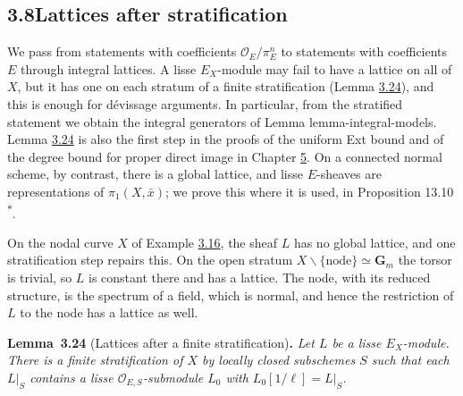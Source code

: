 \documentclass[11pt]{article}
\newenvironment{bpstatement}[2]{\par\addvspace{0.6\baselineskip}\noindent\textbf{#1}#2\textbf{.}\enspace\ignorespaces}
  {\par\addvspace{0.4\baselineskip}}
\newenvironment{bpstatementit}[2]{\begin{bpstatement}{#1}{#2}\itshape\ignorespaces}{\end{bpstatement}}
\newcommand{\bpout}[1]{#1\textsuperscript{\hyperlink{bp-outside}{\ensuremath{\ast}}}}
\begin{document}
\subsection*{\texorpdfstring{3.8\quad Lattices after stratification}{3.8 Lattices after stratification}}
\label{bp267}%
\label{bp268}%
We pass from statements with coefficients \(\mathcal O_E/\pi_E^n\) to statements with coefficients \(E\) through integral lattices. A lisse \(E_X\)-module may fail to have a lattice on all of \(X\), but it has one on each stratum of a finite stratification (Lemma \hyperref[bp269]{3.24}), and this is enough for dévissage arguments. In particular, from the stratified statement we obtain the integral generators of Lemma lemma-integral-models. Lemma \hyperref[bp269]{3.24} is also the first step in the proofs of the uniform Ext bound and of the degree bound for proper direct image in Chapter \hyperref[bp407]{5}. On a connected normal scheme, by contrast, there is a global lattice, and lisse \(E\)-sheaves are representations of \(\pi_1(X,\bar x)\); we prove this where it is used, in Proposition \bpout{13.10}.

On the nodal curve \(X\) of Example \hyperref[bp243]{3.16}, the sheaf \(L\) has no global lattice, and one stratification step repairs this. On the open stratum \(X\smallsetminus\{\text{node}\}\simeq\mathbf G_m\) the torsor is trivial, so \(L\) is constant there and has a lattice. The node, with its reduced structure, is the spectrum of a field, which is normal, and hence the restriction of \(L\) to the node has a lattice as well.

\label{bp269}%
\begin{bpstatementit}{Lemma~3.24}{ (Lattices after a finite stratification)}
Let \(L\) be a lisse \(E_X\)-module. There is a finite stratification of \(X\) by locally closed subschemes \(S\) such that each \(L|_S\) contains a lisse \(\mathcal O_{E,S}\)-submodule \(L_0\) with \(L_0[1/\ell]=L|_S\).
\end{bpstatementit}
\end{document}

